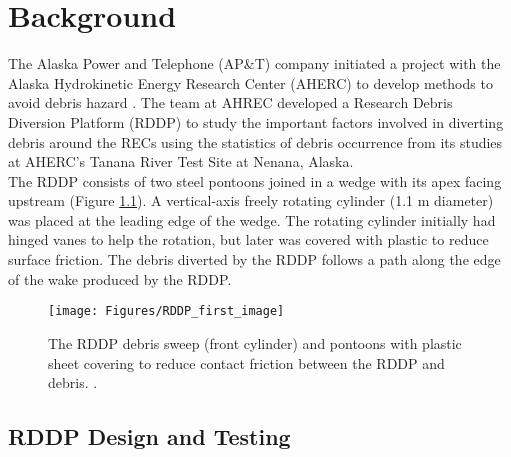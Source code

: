 
\chapter{Background} %

\label{Chapter2} %

The Alaska Power and Telephone (AP\&T) company initiated a project with the Alaska Hydrokinetic Energy Research Center (AHERC) to develop methods to avoid debris hazard \cite{Reference6}. The team at AHREC developed a Research Debris Diversion Platform (RDDP) to study the important factors involved in diverting debris around the RECs using the statistics of debris occurrence from its studies at AHERC's Tanana River Test Site at Nenana, Alaska.\\
The RDDP consists of two steel pontoons joined in a wedge with its apex facing upstream (Figure \ref{fig:RDDP_first_image}). A vertical-axis freely rotating cylinder (1.1 m diameter) was placed at the leading edge of the wedge. The rotating cylinder initially had hinged vanes to help the rotation, but later was covered with plastic to reduce surface friction. The debris diverted by the RDDP follows a path along the edge of the wake produced by the RDDP.\\
\begin{figure}
\centering
\texttt{[image: Figures/RDDP\_first\_image]}
\caption{\label{fig:RDDP_first_image}The RDDP debris sweep (front cylinder) and pontoons with plastic sheet covering to reduce contact friction between the RDDP and debris. \cite{Reference6}.}
\end{figure}
\section{RDDP Design and Testing}
